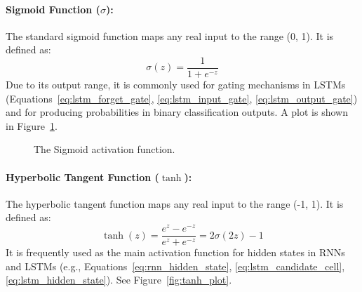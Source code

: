 \paragraph{Sigmoid Function (\( \sigma \)):}
The standard sigmoid function maps any real input to the range (0, 1). It is defined as:
\begin{equation}
  \sigma(z) = \frac{1}{1 + e^{-z}}
\end{equation}
Due to its output range, it is commonly used for gating mechanisms in LSTMs (Equations~\ref{eq:lstm_forget_gate}, \ref{eq:lstm_input_gate}, \ref{eq:lstm_output_gate}) and for producing probabilities in binary classification outputs. A plot is shown in Figure~\ref{fig:sigmoid_plot}.

\begin{figure}[htbp]
  \centering
  \caption{The Sigmoid activation function.}
  \label{fig:sigmoid_plot}
\end{figure}


\paragraph{Hyperbolic Tangent Function (\( \tanh \)):}
The hyperbolic tangent function maps any real input to the range (-1, 1). It is defined as:
\begin{equation}
  \tanh(z) = \frac{e^z - e^{-z}}{e^z + e^{-z}} = 2\sigma(2z) - 1
\end{equation}
It is frequently used as the main activation function for hidden states in RNNs and LSTMs (e.g., Equations~\ref{eq:rnn_hidden_state}, \ref{eq:lstm_candidate_cell}, \ref{eq:lstm_hidden_state}). See Figure~\ref{fig:tanh_plot}.

